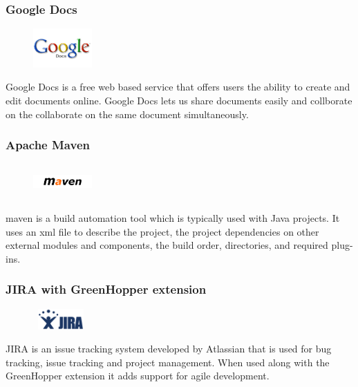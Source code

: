 \subsubsection{Google Docs}
\begin{figure}
  \vspace{-115pt}
  \begin{center}
    \includegraphics[width=0.2\textwidth]{GoogleDocs}
  \end{center}

\end{figure}
Google Docs is a free web based service that offers users the ability to create and edit documents online. Google Docs lets us share documents easily and collborate on the collaborate on the same document simultaneously.	

\subsubsection{Apache Maven}
\begin{figure}
  \vspace{-35pt}
  \begin{center}
    \includegraphics[width=0.2\textwidth, height=50px]{Maven}
  \end{center}

\end{figure}
\gls{maven} is a build automation tool which is typically used with Java projects. It uses an \gls{xml} file to describe the project, the project dependencies on other external modules and components, the build order, directories, and required plug-ins.   

\subsubsection{JIRA with GreenHopper extension}
\begin{figure}
  \vspace{-40pt}
  \begin{center}
    \includegraphics[width=80px,height=30px]{Jira}
  \end{center}

\end{figure}
JIRA is an issue tracking system developed by Atlassian that is used for bug tracking, issue tracking and project management. When used along with the GreenHopper extension it adds support for agile development.

